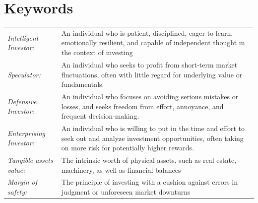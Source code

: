 \section*{Keywords}
\begin{tabularx}{\textwidth}{ l X }
    \textit{Intelligent Investor:} & An individual who is patient, disciplined, eager to learn, emotionally resilient, and capable of independent thought in the context of investing \\ 
    \textit{Speculator:} & An individual who seeks to profit from short-term market fluctuations, often with little regard for underlying value or fundamentals. \\
    \textit{Defensive Investor:} & An individual who focuses on avoiding serious mistakes or losses, and seeks freedom from effort, annoyance, and frequent decision-making. \\
    \textit{Enterprising Investor:} & An individual who is willing to put in the time and effort to seek out and analyze investment opportunities, often taking on more risk for potentially higher rewards. \\
    \textit{Tangible assets value:} & The intrinsic worth of physical assets, such as real estate, machinery, as well as financial balances \\
    \textit{Margin of safety:} & The principle of investing with a cushion against errors in judgment or unforeseen market downturns \\
\end{tabularx}
